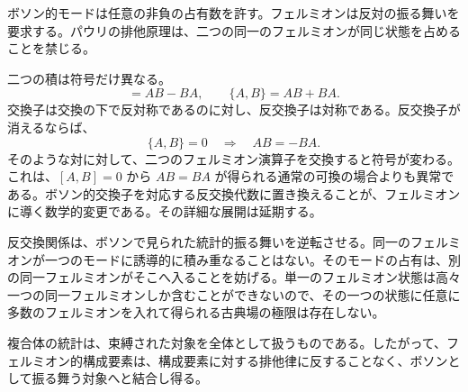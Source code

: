 ボソン的モードは任意の非負の占有数を許す。フェルミオンは反対の振る舞いを要求する。パウリの排他原理は、二つの同一のフェルミオンが同じ状態を占めることを禁じる。

\begin{classroomqa}
\end{classroomqa}

二つの積は符号だけ異なる。
\begin{equation}
[A,B]=AB-BA,
\qquad
\{A,B\}=AB+BA.
\end{equation}
交換子は交換の下で反対称であるのに対し、反交換子は対称である。反交換子が消えるならば、
\begin{equation}
\{A,B\}=0
\quad\Longrightarrow\quad
AB=-BA.
\end{equation}
そのような対に対して、二つのフェルミオン演算子を交換すると符号が変わる。これは、\([A,B]=0\) から \(AB=BA\) が得られる通常の可換の場合よりも異常である。ボソン的交換子を対応する反交換代数に置き換えることが、フェルミオンに導く数学的変更である。その詳細な展開は延期する。

反交換関係は、ボソンで見られた統計的振る舞いを逆転させる。同一のフェルミオンが一つのモードに誘導的に積み重なることはない。そのモードの占有は、別の同一フェルミオンがそこへ入ることを妨げる。単一のフェルミオン状態は高々一つの同一フェルミオンしか含むことができないので、その一つの状態に任意に多数のフェルミオンを入れて得られる古典場の極限は存在しない。

\begin{classroomqa}
\end{classroomqa}

複合体の統計は、束縛された対象を全体として扱うものである。したがって、フェルミオン的構成要素は、構成要素に対する排他律に反することなく、ボソンとして振る舞う対象へと結合し得る。

